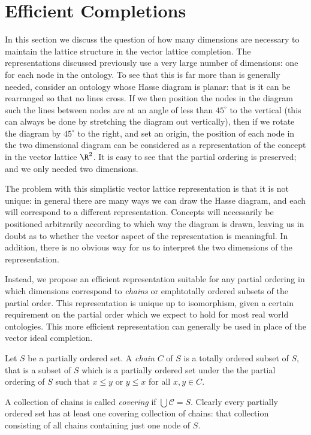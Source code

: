 \section{Efficient Completions}

In this section we discuss the question of how many dimensions are necessary to maintain the lattice structure in the vector lattice completion. The representations discussed previously use a very large number of dimensions: one for each node in the ontology. To see that this is far more than is generally needed, consider an ontology whose Hasse diagram is planar: that is it can be rearranged so that no lines cross. If we then position the nodes in the diagram such the lines between nodes are at an angle of less than $45^\circ$ to the vertical (this can always be done by stretching the diagram out vertically), then if we rotate the diagram by $45^\circ$ to the right, and set an origin, the position of each node in the two dimensional diagram can be considered as a representation of the concept in the vector lattice $\R^2$. It is easy to see that the partial ordering is preserved; and we only needed two dimensions.

The problem with this simplistic vector lattice representation is that it is not unique: in general there are many ways we can draw the Hasse diagram, and each will correspond to a different representation. Concepts will necessarily be positioned arbitrarily according to which way the diagram is drawn, leaving us in doubt as to whether the vector aspect of the representation is meaningful. In addition, there is no obvious way for us to interpret the two dimensions of the representation.

Instead, we propose an efficient  representation suitable for any partial ordering in which dimensions correspond to \emph{chains} or emph{totally ordered subsets} of the partial order. This representation is unique up to isomorphism, given a certain requirement on the partial order which we expect to hold for most real world ontologies. This more efficient representation can generally be used in place of the vector ideal completion.

\begin{defn}[Chains]
Let $S$ be a partially ordered set. A \emph{chain} $C$ of $S$ is a totally ordered subset of $S$, that is a subset of $S$ which is a partially ordered set under the the partial ordering of $S$ such that $x \le y$ or $y \le x$ for all $x,y \in C$.

A collection of chains is called \emph{covering} if $\bigcup \mathcal{C} = S$. Clearly every partially ordered set has at least one covering collection of chains: that collection consisting of all chains containing just one node of $S$.
\end{defn}

